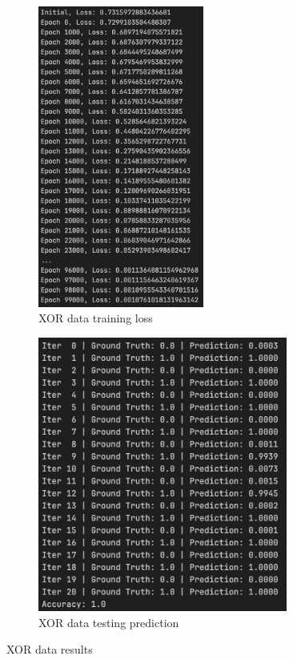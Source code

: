 \documentclass{homework}
\begin{document}
\begin{figure}[H]
    \centering
    \begin{subfigure}{0.45\textwidth}
        \centering
        \includegraphics[width=0.6\textwidth]{xor_train.png}
        \caption{XOR data training loss}
    \end{subfigure}
    \begin{subfigure}{0.45\textwidth}
        \centering
        \includegraphics[width=0.9\textwidth]{xor_test.png}
        \caption{XOR data testing prediction}
    \end{subfigure}
    \caption{XOR data results}
\end{figure}
\end{document}
